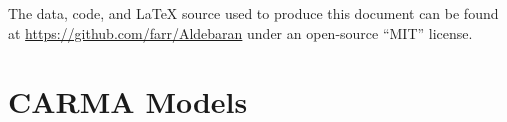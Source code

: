 \documentclass[modern]{aastex61}
\begin{document}

The data, code, and \LaTeX{} source used to produce this document can be found
at \url{https://github.com/farr/Aldebaran} under an open-source ``MIT'' license.




\appendix

\section{CARMA Models}
\label{carmatheory}
\end{document}
